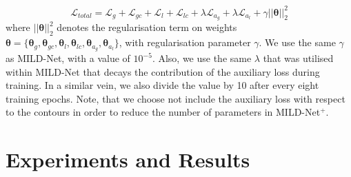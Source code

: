 \documentclass[3p]{elsarticle}
\begin{document}
\begin{equation}
\mathcal{L}_{total} = \mathcal{L}_g + \mathcal{L}_{gc} +\mathcal{L}_l + \mathcal{L}_{lc} + \lambda\mathcal{L}_{a_g} + \lambda\mathcal{L}_{a_l} +\gamma||\mathbold{\theta}||_2^2
\end{equation}
\noindent where $||\mathbold{\theta}||_2^2$ denotes the regularisation term on weights $\mathbold{\theta}=\{\mathbold{\theta}_g,\mathbold{\theta}_{gc},\mathbold{\theta}_l,\mathbold{\theta}_{lc},\mathbold{\theta}_{a_g},\mathbold{\theta}_{a_l}\}$, with regularisation parameter $\gamma$. We use the same $\gamma$ as MILD-Net, with a value of $10^{-5}$. Also, we use the same $\lambda$ that was utilised within MILD-Net that decays the contribution of the auxiliary loss during training. In a similar vein, we also divide the value by 10 after every eight training epochs. Note, that we choose not include the auxiliary loss with respect to the contours in order to reduce the number of parameters in MILD-Net$^+$.

\section{Experiments and Results}
\end{document}
